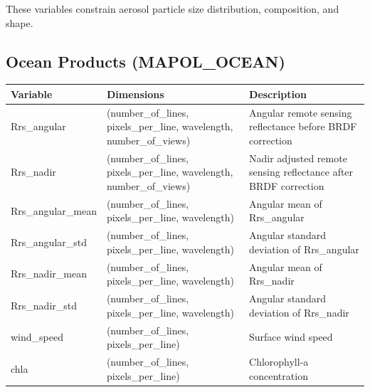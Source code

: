 \documentclass[
  letterpaper,
  open=any]{scrbook}
\begin{document}
These variables constrain aerosol particle size distribution,
composition, and shape.

\subsection{Ocean Products
(MAPOL\_OCEAN)}\label{ocean-products-mapol_ocean}

\begin{longtable}[]{@{}
  >{\raggedright\arraybackslash}p{}
  >{\raggedright\arraybackslash}p{}
  >{\raggedright\arraybackslash}p{}@{}}
\toprule\noalign{}
\begin{minipage}[b]{\linewidth}\raggedright
Variable
\end{minipage} & \begin{minipage}[b]{\linewidth}\raggedright
Dimensions
\end{minipage} & \begin{minipage}[b]{\linewidth}\raggedright
Description
\end{minipage} \\
\midrule\noalign{}
\endhead
\bottomrule\noalign{}
\endlastfoot
Rrs\_angular & (number\_of\_lines, pixels\_per\_line, wavelength,
number\_of\_views) & Angular remote sensing reflectance before BRDF
correction \\
Rrs\_nadir & (number\_of\_lines, pixels\_per\_line, wavelength,
number\_of\_views) & Nadir adjusted remote sensing reflectance after
BRDF correction \\
Rrs\_angular\_mean & (number\_of\_lines, pixels\_per\_line, wavelength)
& Angular mean of Rrs\_angular \\
Rrs\_angular\_std & (number\_of\_lines, pixels\_per\_line, wavelength) &
Angular standard deviation of Rrs\_angular \\
Rrs\_nadir\_mean & (number\_of\_lines, pixels\_per\_line, wavelength) &
Angular mean of Rrs\_nadir \\
Rrs\_nadir\_std & (number\_of\_lines, pixels\_per\_line, wavelength) &
Angular standard deviation of Rrs\_nadir \\
wind\_speed & (number\_of\_lines, pixels\_per\_line) & Surface wind
speed \\
chla & (number\_of\_lines, pixels\_per\_line) & Chlorophyll-a
concentration \\
\end{longtable}
\end{document}
